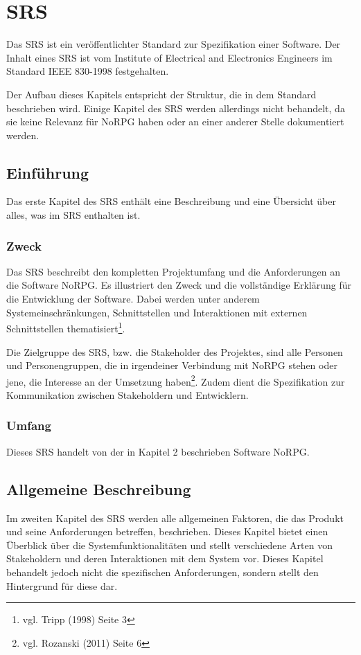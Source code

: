 \chapter{\acl{SRS}}
	Das \acf{SRS} ist ein veröffentlichter Standard zur Spezifikation einer Software. Der Inhalt eines \ac{SRS} ist vom Institute of Electrical and Electronics Engineers im Standard IEEE 830-1998 festgehalten.
	
	Der Aufbau dieses Kapitels entspricht der Struktur, die in dem Standard beschrieben wird. Einige Kapitel des SRS werden allerdings nicht behandelt, da sie keine Relevanz für NoRPG haben oder an einer anderer Stelle dokumentiert werden.
	
\section{Einführung}
	Das erste Kapitel des \ac{SRS} enthält eine Beschreibung und eine Übersicht über alles, was im \ac{SRS} enthalten ist.
	
	\subsection{Zweck}
		Das \ac{SRS} beschreibt den kompletten Projektumfang und die Anforderungen an die Software NoRPG. Es illustriert den Zweck und die vollständige Erklärung für die Entwicklung der Software. Dabei werden unter anderem Systemeinschränkungen, Schnittstellen und Interaktionen mit externen Schnittstellen thematisiert\footnote{vgl. Tripp \cite{srsIEEE}(1998) Seite 3}. 
	
		Die Zielgruppe des \ac{SRS}, bzw. die Stakeholder des Projektes, sind alle Personen und Personengruppen, die in irgendeiner Verbindung mit NoRPG stehen oder jene, die Interesse an der Umsetzung haben\footnote{vgl. Rozanski \cite{rozanski2011}(2011) Seite 6}. Zudem dient die Spezifikation zur Kommunikation zwischen Stakeholdern und Entwicklern.
		
	\subsection{Umfang}
		Dieses \ac{SRS} handelt von der in Kapitel 2 beschrieben Software NoRPG. 
		
\section{Allgemeine Beschreibung}
	Im zweiten Kapitel des \ac{SRS} werden alle allgemeinen Faktoren, die das Produkt und seine Anforderungen betreffen, beschrieben. Dieses Kapitel bietet einen Überblick über die Systemfunktionalitäten und stellt verschiedene Arten von Stakeholdern und deren Interaktionen mit dem System vor. Dieses Kapitel behandelt jedoch nicht die spezifischen Anforderungen, sondern stellt den Hintergrund für diese dar. 

